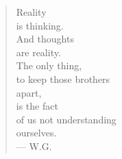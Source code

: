 \begin{verse}
Reality \\
is thinking. \\
And thoughts \\
are reality. \\
The only thing, \\
to keep those brothers \\
apart, \\
is the fact \\
of us not understanding \\
ourselves. \\
--- W.G.
\end{verse}

